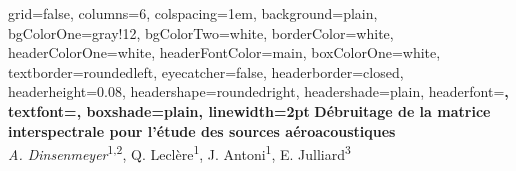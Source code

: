 \documentclass[portrait,final,a0paper,]{baposter}
\begin{document}


\begin{poster}%
  {
  grid=false,
  columns=6,
  colspacing=1em,
  background=plain,%
  bgColorOne=gray!12,%
  bgColorTwo=white,
  borderColor=white,%
  headerColorOne=white,%
  headerFontColor=main,%
  boxColorOne=white,%
  textborder=roundedleft,%
  eyecatcher=false,
  headerborder=closed,
  headerheight=0.08\textheight,
  headershape=roundedright,
  headershade=plain,%
  headerfont=\Large\bfseries,%
  textfont={\setlength{\parindent}{1.5em}},
  boxshade=plain,
  linewidth=2pt
  }
  {  }
 {
\vspace{0.4cm}\textcolor{main}{\textbf{Débruitage de la matrice interspectrale pour l'étude des sources aéroacoustiques}}}
  { ~\\ \textit{A. Dinsenmeyer}\textsuperscript{1,2}, Q. Leclère\textsuperscript{1}, J. Antoni\textsuperscript{1}, E. Julliard\hspace{0.1ex}\textsuperscript{3}}
  {  }
  

\end{poster}
\end{document}
